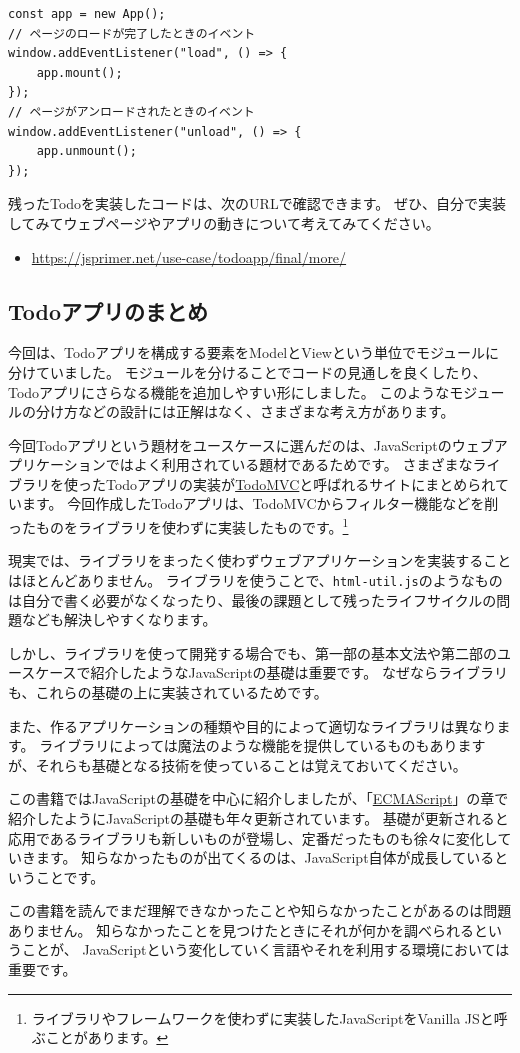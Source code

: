 \begin{lstlisting}
const app = new App();
// ページのロードが完了したときのイベント
window.addEventListener("load", () => {
    app.mount();
});
// ページがアンロードされたときのイベント
window.addEventListener("unload", () => {
    app.unmount();
});
\end{lstlisting}

残ったTodoを実装したコードは、次のURLで確認できます。
ぜひ、自分で実装してみてウェブページやアプリの動きについて考えてみてください。

\begin{itemize}
\item
  \url{https://jsprimer.net/use-case/todoapp/final/more/}
\end{itemize}

\hypertarget{todo-conclusion}{%
\subsection{Todoアプリのまとめ}\label{todo-conclusion}}

今回は、Todoアプリを構成する要素をModelとViewという単位でモジュールに分けていました。
モジュールを分けることでコードの見通しを良くしたり、Todoアプリにさらなる機能を追加しやすい形にしました。
このようなモジュールの分け方などの設計には正解はなく、さまざまな考え方があります。

今回Todoアプリという題材をユースケースに選んだのは、JavaScriptのウェブアプリケーションではよく利用されている題材であるためです。
さまざまなライブラリを使ったTodoアプリの実装が\href{http://todomvc.com/}{TodoMVC}と呼ばれるサイトにまとめられています。
今回作成したTodoアプリは、TodoMVCからフィルター機能などを削ったものをライブラリを使わずに実装したものです。\footnote{ライブラリやフレームワークを使わずに実装したJavaScriptをVanilla
  JSと呼ぶことがあります。}

現実では、ライブラリをまったく使わずウェブアプリケーションを実装することはほとんどありません。
ライブラリを使うことで、\texttt{html-util.js}のようなものは自分で書く必要がなくなったり、最後の課題として残ったライフサイクルの問題なども解決しやすくなります。

しかし、ライブラリを使って開発する場合でも、第一部の基本文法や第二部のユースケースで紹介したようなJavaScriptの基礎は重要です。
なぜならライブラリも、これらの基礎の上に実装されているためです。

また、作るアプリケーションの種類や目的によって適切なライブラリは異なります。
ライブラリによっては魔法のような機能を提供しているものもありますが、それらも基礎となる技術を使っていることは覚えておいてください。

この書籍ではJavaScriptの基礎を中心に紹介しましたが、「\href{../../../basic/ecmascript/README.md}{ECMAScript}」の章で紹介したようにJavaScriptの基礎も年々更新されています。
基礎が更新されると応用であるライブラリも新しいものが登場し、定番だったものも徐々に変化していきます。
知らなかったものが出てくるのは、JavaScript自体が成長しているということです。

この書籍を読んでまだ理解できなかったことや知らなかったことがあるのは問題ありません。
知らなかったことを見つけたときにそれが何かを調べられるということが、
JavaScriptという変化していく言語やそれを利用する環境においては重要です。
